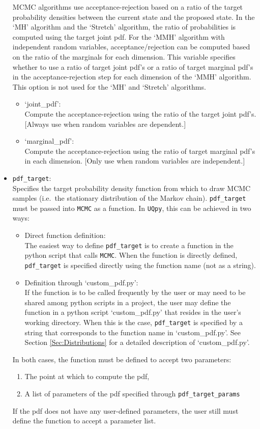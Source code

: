 \begin{itemize}
	MCMC algorithms use acceptance-rejection based on a ratio of the target probability densities between the current state and the proposed state. In the `MH' algorithm and the 		`Stretch' algorithm, the ratio of probabilities is computed using the target joint pdf. For the `MMH' algorithm with independent random variables, acceptance/rejection can be computed 	based on the ratio of the marginals for each dimension. This variable specifies whether to use a ratio of target joint pdf's or a ratio of target marginal pdf's in the acceptance-rejection 	step for each dimension of the `MMH' algorithm. This option is not used for the `MH' and `Stretch' algorithms.
	\begin{itemize}
		\item `joint\_pdf': \\
			Compute the acceptance-rejection using the ratio of the target joint pdf's. [Always use when random variables are dependent.]
		\item `marginal\_pdf': \\
			Compute the acceptance-rejection using the ratio of target marginal pdf's in each dimension. [Only use when random variables are independent.]
	\end{itemize} 
\item \texttt{pdf\_target}:\\ 
	Specifies the target probability density function from which to draw MCMC samples (i.e.\ the stationary distribution of the Markov chain). \texttt{pdf\_target} must be passed into 		\texttt{MCMC} as a function. In \texttt{UQpy}, this can be achieved in two ways:
	\begin{itemize}
		\item Direct function definition:\\
		The easiest way to define \texttt{pdf\_target} is to create a function in the python script that calls \texttt{MCMC}. When the function is directly defined, \texttt{pdf\_target} is 			specified directly using the function name (not as a string). 
		\item Definition through `custom\_pdf.py':\\
		If the function is to be called frequently by the user or may need to be shared among python scripts in a project, the user may define the function in a python script 					`custom\_pdf.py' that resides in the user's working directory. When this is the case, \texttt{pdf\_target} is specified by a string that corresponds to the function name in 				`custom\_pdf.py'. See Section \ref{Sec:Distributions} for a detailed description of `custom\_pdf.py'.
	\end{itemize} 
	In both cases, the function must be defined to accept two parameters: 
	\begin{enumerate}
		\item The point at which to compute the pdf, 
		\item A list of parameters of the pdf specified through \texttt{pdf\_target\_params} 
	\end{enumerate}
	If the pdf does not have any user-defined parameters, the user still must define the function to accept a parameter list.\\


\end{itemize}

